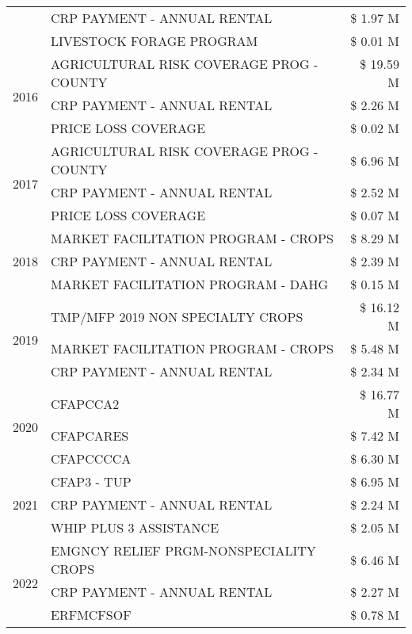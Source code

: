 \begin{tabular}{llr}
 & CRP PAYMENT - ANNUAL RENTAL & \$ 1.97 M \\
 & LIVESTOCK FORAGE PROGRAM & \$ 0.01 M \\
\cline{1-3}
\multirow[t]{3}{*}{2016} & AGRICULTURAL RISK COVERAGE PROG - COUNTY & \$ 19.59 M \\
 & CRP PAYMENT - ANNUAL RENTAL & \$ 2.26 M \\
 & PRICE LOSS COVERAGE & \$ 0.02 M \\
\cline{1-3}
\multirow[t]{3}{*}{2017} & AGRICULTURAL RISK COVERAGE PROG - COUNTY & \$ 6.96 M \\
 & CRP PAYMENT - ANNUAL RENTAL & \$ 2.52 M \\
 & PRICE LOSS COVERAGE & \$ 0.07 M \\
\cline{1-3}
\multirow[t]{3}{*}{2018} & MARKET FACILITATION PROGRAM - CROPS & \$ 8.29 M \\
 & CRP PAYMENT - ANNUAL RENTAL & \$ 2.39 M \\
 & MARKET FACILITATION PROGRAM - DAHG & \$ 0.15 M \\
\cline{1-3}
\multirow[t]{3}{*}{2019} & TMP/MFP 2019 NON SPECIALTY CROPS & \$ 16.12 M \\
 & MARKET FACILITATION PROGRAM - CROPS & \$ 5.48 M \\
 & CRP PAYMENT - ANNUAL RENTAL & \$ 2.34 M \\
\cline{1-3}
\multirow[t]{3}{*}{2020} & CFAPCCA2 & \$ 16.77 M \\
 & CFAPCARES & \$ 7.42 M \\
 & CFAPCCCCA & \$ 6.30 M \\
\cline{1-3}
\multirow[t]{3}{*}{2021} & CFAP3 - TUP & \$ 6.95 M \\
 & CRP PAYMENT - ANNUAL RENTAL & \$ 2.24 M \\
 & WHIP PLUS 3 ASSISTANCE & \$ 2.05 M \\
\cline{1-3}
\multirow[t]{3}{*}{2022} & EMGNCY RELIEF PRGM-NONSPECIALITY CROPS & \$ 6.46 M \\
 & CRP PAYMENT - ANNUAL RENTAL & \$ 2.27 M \\
 & ERFMCFSOF & \$ 0.78 M \\
\cline{1-3}
\bottomrule
\end{tabular}
